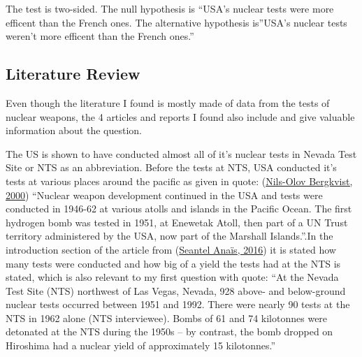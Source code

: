 \documentclass[
  12pt,
]{article}
\begin{document}
The test is two-sided. The null hypothesis is ``USA's nuclear tests were more efficent than the French ones. The alternative hypothesis is''USA's nuclear tests weren't more efficent than the French ones.''

\hypertarget{literature-review}{%
\subsection{Literature Review}\label{literature-review}}

Even though the literature I found is mostly made of data from the tests of nuclear weapons, the 4 articles and reports I found also include and give valuable information about the question.

The US is shown to have conducted almost all of it's nuclear tests in Nevada Test Site or NTS as an abbreviation. Before the tests at NTS, USA conducted it's tests at various places around the pacific as given in quote: (\protect\hyperlink{ref-bergkvist:2000}{Nils-Olov Bergkvist, 2000}) ``Nuclear weapon development continued in the USA and tests were conducted in 1946-62 at various atolls and islands in the Pacific Ocean. The first hydrogen bomb was tested in 1951, at Enewetak Atoll, then part of a UN Trust territory administered by the USA, now part of the Marshall Islands.''.In the introduction section of the article from (\protect\hyperlink{ref-anauxefs:2016}{Seantel Anaïs, 2016}) it is stated how many tests were conducted and how big of a yield the tests had at the NTS is stated, which is also relevant to my first question with quote: ``At the Nevada Test Site (NTS) northwest of Las Vegas, Nevada, 928 above- and below-ground nuclear tests occurred between 1951 and 1992. There were nearly 90 tests at the NTS in 1962 alone (NTS interviewee). Bombs of 61 and 74 kilotonnes were detonated at the NTS during the 1950s -- by contrast, the bomb dropped on Hiroshima had a nuclear yield of approximately 15 kilotonnes.''
\end{document}
